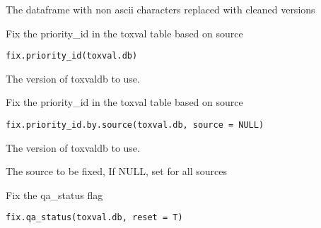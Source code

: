 \documentclass[letterpaper]{book}
\begin{document}
%
\begin{Value}
The dataframe with non ascii characters replaced with cleaned versions
\end{Value}
%
\begin{Description}\relax
Fix the priority\_id in the toxval table based on source
\end{Description}
%
\begin{Usage}
\begin{verbatim}
fix.priority_id(toxval.db)
\end{verbatim}
\end{Usage}
%
\begin{Arguments}
\begin{ldescription}
\item[\code{toxval.db}] The version of toxvaldb to use.
\end{ldescription}
\end{Arguments}
%
\begin{Description}\relax
Fix the priority\_id in the toxval table based on source
\end{Description}
%
\begin{Usage}
\begin{verbatim}
fix.priority_id.by.source(toxval.db, source = NULL)
\end{verbatim}
\end{Usage}
%
\begin{Arguments}
\begin{ldescription}
\item[\code{toxval.db}] The version of toxvaldb to use.

\item[\code{source}] The source to be fixed, If NULL, set for all sources
\end{ldescription}
\end{Arguments}
%
\begin{Description}\relax
Fix the qa\_status flag
\end{Description}
%
\begin{Usage}
\begin{verbatim}
fix.qa_status(toxval.db, reset = T)
\end{verbatim}
\end{Usage}
\end{document}
